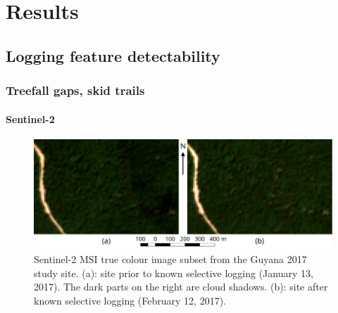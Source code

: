 \documentclass[a4paper,12pt]{scrbook}
\begin{document}
\chapter{Results}

\section{Logging feature detectability}

\subsection{Treefall gaps, skid trails}


\subsubsection{Sentinel-2}
\label{sec-treefall-sentinel2}

\begin{figure}
  \centering
  \includegraphics[width=\textwidth]{thesis-figures/02-guyana-sentinel2-tci}
  \caption{Sentinel-2 \ac{MSI} true colour image subset from the Guyana 2017 study site. (a): site prior to known selective logging (January 13, 2017). The dark parts on the right are cloud shadows. (b): site after known selective logging (February 12, 2017).}
  \label{fig-guyana-sentinel2-tci}
\end{figure}
\end{document}
